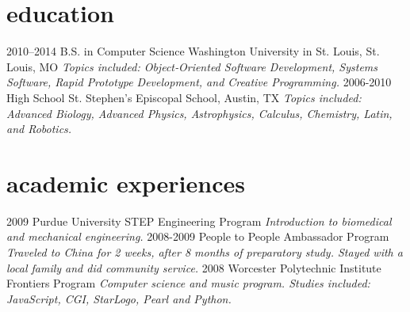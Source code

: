 \documentclass[]{cv}
\begin{document}
\section{education}

\begin{entrylist}
  \entry
    {2010–2014}
    {B.S. in Computer Science}
    {Washington University in St. Louis, St. Louis, MO}
    {\emph{Topics included: Object‐Oriented Software Development, Systems Software, Rapid Prototype Development, and Creative Programming.}}
  \entry
    {2006-2010}
    {High School}
    {St. Stephen’s Episcopal School, Austin, TX}
    {\emph{Topics included: Advanced Biology, Advanced Physics, Astrophysics, Calculus, Chemistry, Latin, and Robotics.}}
\end{entrylist}

\section{academic experiences}

\begin{entrylist}
  \entry
    {2009}
    {Purdue University STEP Engineering Program}{}
    {\emph{Introduction to biomedical and mechanical engineering.}}
  \entry
    {2008-2009}
    {People to People Ambassador Program}{}
    {\emph{Traveled to China for 2 weeks, after 8 months of preparatory study. Stayed with a local family and did community service.}}
  \entry
    {2008}
    {Worcester Polytechnic Institute Frontiers Program}{}
    {\emph{Computer science and music program. Studies included: JavaScript, CGI, StarLogo, Pearl and Python.}}
\end{entrylist}
\end{document}
